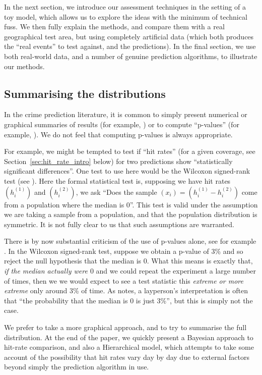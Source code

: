 \documentclass[twoside,a4paper,twocolumn,10pt]{article}
\theoremstyle{plain}
\theoremstyle{definition}
\begin{document}
In the next section, we introduce our assessment techniques in the setting of a
toy model, which allows us to explore the ideas with the minimum of technical fuss.
We then fully explain the methods, and compare them with a real geographical test
area, but using completely artificial data (which both produces the ``real events''
to test against, and the predictions).  In the final section, we use both real-world
data, and a number of genuine prediction algorithms, to illustrate our methods.


\subsection{Summarising the distributions}

In the crime prediction literature, it is common to simply present numerical
or graphical summaries of results (for example, \cite{bjp, ctu})
or to compute ``p-values'' (for example, \cite{arc, blx}).  We do not feel
that computing p-values is always appropriate.

For example, we might be tempted
to test if ``hit rates'' (for a given coverage, see
Section~\ref{sec:hit_rate_intro} below) for two predictions show ``statistically
significant differences''.  One test to use here would be the Wilcoxon signed-rank
test (see \cite[Test~6]{sheskin}).  Here the formal statistical test is,
supposing we have hit rates $(h_i^{(1)})$ and $(h_i^{(2)})$, we ask
``Does the sample $(x_i) = (h_i^{(1)} - h_i^{(2)})$ come from a population
where the median is $0$''.  This test is valid under the assumption we are
taking a sample from a population, and that the population distribution
is symmetric.  It is not fully clear to us that such assumptions are warranted.

There is by now substantial criticism of the use of p-values alone, see
for example \cite{nature}.  In the Wilcoxon signed-rank test, suppose we obtain
a p-value of 3\% and so reject the null hypothesis that the median is $0$. 
What this means is exactly that, \emph{if the median actually were $0$} and we
could repeat the experiment a large number of times, then we we would expect
to see a test statistic this \emph{extreme or more extreme} only around
3\% of time.  As \cite[Section~2.3.3]{cl} notes, a layperson's interpretation
is often that ``the probability that the median is 0 is just 3\%'', but this
is simply not the case.

We prefer to take a more graphical approach, and to try to summarise the
full distribution.  At the end of the paper, we quickly present a Bayesian
approach to hit-rate comparison, and also a Hierarchical model, which attempts to
take some account of the possibility that hit rates vary day by day due to external
factors beyond simply the prediction algorithm in use.
\end{document}
